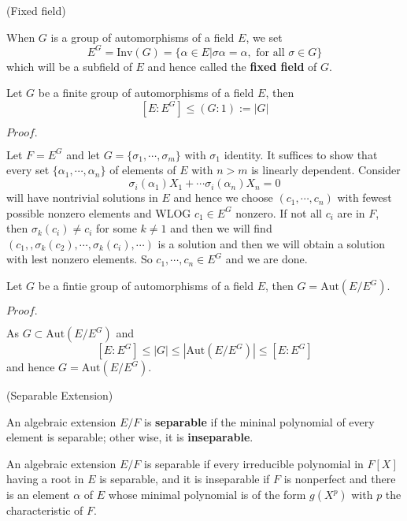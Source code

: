 \documentclass{article}
\newcommand{\Pf}[1]{$Proof.$\par}
\begin{document}
\begin{definition}
    (Fixed field)\par
    When $G$ is a group of automorphisms of a field $E$, we set
    \[E^G = \text{Inv}(G) = \{\alpha \in E| \sigma \alpha = \alpha,\text{ for all }\sigma\in G\}\]
    which will be a subfield of $E$ and hence called the \textbf{fixed field} of $G$.
\end{definition}

\begin{theorem}
    Let $G$ be a finite group of automorphisms of a field $E$, then
    \[[E:E^G] \leq (G:1):=|G|\]
\end{theorem}
\Pf\par
    Let $F = E^G$ and let $G = \{\sigma_1,\cdots,\sigma_m\}$ with $\sigma_1$ identity. It suffices to show that every set $\{\alpha_1,\cdots,\alpha_n\}$ of elements of $E$ with $n>m$ is linearly dependent. Consider
    \[
    \sigma_i(\alpha_1)X_1 + \cdots \sigma_i(\alpha_n) X_n = 0
    \]
    will have nontrivial solutions in $E$ and hence we choose $(c_1,\cdots,c_n)$ with fewest possible nonzero elements and WLOG $c_1 \in E^G$ nonzero. If not all $c_i$ are in $F$, then $\sigma_k(c_i) \neq c_i$ for some $k \neq 1$ and then we will find
    $(c_1,,\sigma_k(c_2),\cdots,\sigma_k(c_i),\cdots)$
    is a solution and then we will obtain a solution with lest nonzero elements. So $c_1,\cdots,c_n \in E^G$ and we are done.

\begin{corollary}
    Let $G$ be a fintie group of automorphisms of a field $E$, then $G = \text{Aut}(E/E^G)$. 
\end{corollary}
\Pf\par
    As $G\subset \text{Aut}(E/E^G)$ and
    \[
    [E:E^G] \leq |G| \leq |\text{Aut}(E/E^G)| \leq [E:E^G]
    \]
    and hence $G = \text{Aut}(E/E^G)$.

\begin{definition}
    (Separable Extension)\par
    An algebraic extension $E/F$ is \textbf{separable} if the mininal polynomial of every element is separable; other wise, it is \textbf{inseparable}.
\end{definition}

\begin{proposition}
    An algebraic extension $E/F$ is separable if every irreducible polynomial in $F[X]$ having a root in $E$ is separable, and it is inseparable if $F$ is nonperfect and there is an element $\alpha$ of $E$ whose minimal polynomial is of the form $g(X^p)$ with $p$ the characteristic of $F$.
\end{proposition}
\end{document}
